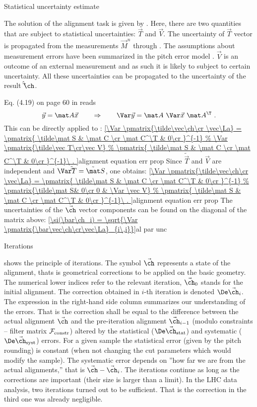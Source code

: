 \caption{Statistical uncertainty estimate}

The solution of the alignment task is given by . Here, there are two quantities that are subject to statistical uncertainties: $\vec T$ and $\vec V$. The uncertainty of $\vec T$ vector is propagated from the measurements $\vec M^n$ through . The assumptions about measurement errors have been summarized in the pitch error model . $\vec V$ is an outcome of an external measurement and as such it is likely to subject to certain uncertainty. All these uncertainties can be propagated to the uncertainty of the result $\hat\vec\ch$.

Eq\hbox{.} (4.19) on page 60 in  reads
$$\vec y = \mat A\vec x \qquad \Rightarrow \qquad \Var\vec y = \mat A\ \Var\vec x\ \mat A^\T\ .$$
This can be directly applied to :
\eqref{\Var \pmatrix{\tilde\vec\ch\cr \vec\La} = 
\pmatrix{
\tilde\mat S & \mat C \cr
\mat C^\T & 0\cr
}^{-1}
%
\Var \pmatrix{\tilde\vec T\cr\vec V}
%
\pmatrix{
\tilde\mat S & \mat C \cr
\mat C^\T & 0\cr
}^{-1}\ .
}{alignment equation err prop}
Since $\tilde\vec T$ and $\vec V$ are independent and $\Var \tilde\vec T = \tilde\mat S$, one obtains:
\eqref{\Var \pmatrix{\tilde\vec\ch\cr \vec\La} = 
\pmatrix{
\tilde\mat S & \mat C \cr
\mat C^\T & 0\cr
}^{-1}
%
\pmatrix{\tilde\mat S& 0\cr 0 & \Var \vec V}
%
\pmatrix{
\tilde\mat S & \mat C \cr
\mat C^\T & 0\cr
}^{-1}\ .
}{alignment equation err prop}
The uncertainties of the $\vec\ch$ vector components can be found on the diagonal of the matrix above:
\eqref{\si(\bar\ch_i) = \sqrt{\Var \pmatrix{\bar\vec\ch\cr\vec\La}_{i\,i}}}{al par unc}

\caption{Iterations}

 shows the principle of iterations. The symbol $\vec\ch$ represents a state of the alignment, thats is geometrical corrections to be applied on the basic geometry. The numerical lower indices refer to the relevant iteration, $\vec\ch_0$ stands for the initial alignment. The correction obtained in $i$-th iteration is denoted $\De \vec\ch_i$. The expression in the right-hand side column summarizes our understanding of the errors. That is the correction shall be equal to the difference between the actual alignment $\vec\ch$ and the pre-iteration alignment $\vec\ch_{i-1}$ (modulo constraints -- filter matrix ${\cal F}_{\rm constr}$) altered by the statistical ($\De \vec\ch_{\rm stat}$) and systematic ($\De \vec\ch_{\rm syst}$) errors. For a given sample the statistical error (given by the pitch rounding) is constant (when not changing the cut parameters which would modify the sample). The systematic error depends on ''how far we are from the actual alignments,'' that is $\vec\ch - \vec\ch_i$. The iterations continue as long as the corrections are important (their size is larger than a limit). In the LHC data analysis, two iterations turned out to be sufficient. That is the correction in the third one was already negligible.

